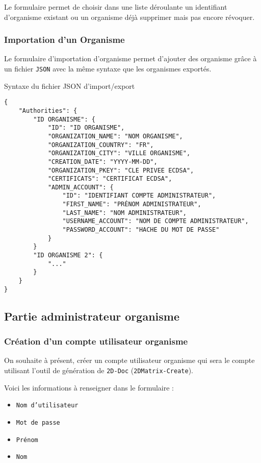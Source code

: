 Le formulaire permet de choisir dans une liste déroulante un identifiant d'organisme existant ou un organisme déjà supprimer mais pas encore révoquer.

\subsubsection{Importation d'un Organisme}\label{import}

Le formulaire d'importation d'organisme permet d'ajouter des organisme grâce à un fichier \texttt{JSON} avec la même syntaxe que les organismes exportés. 

\begin{center}
    Syntaxe du fichier JSON d'import/export
\end{center}

\begin{verbatim}
{
    "Authorities": {
        "ID ORGANISME": {
            "ID": "ID ORGANISME",
            "ORGANIZATION_NAME": "NOM ORGANISME",
            "ORGANIZATION_COUNTRY": "FR",
            "ORGANIZATION_CITY": "VILLE ORGANISME",
            "CREATION_DATE": "YYYY-MM-DD",
            "ORGANIZATION_PKEY": "CLE PRIVEE ECDSA",
            "CERTIFICATS": "CERTIFICAT ECDSA",
            "ADMIN_ACCOUNT": {
                "ID": "IDENTIFIANT COMPTE ADMINISTRATEUR",
                "FIRST_NAME": "PRÉNOM ADMINISTRATEUR",
                "LAST_NAME": "NOM ADMINISTRATEUR",
                "USERNAME_ACCOUNT": "NOM DE COMPTE ADMINISTRATEUR",
                "PASSWORD_ACCOUNT": "HACHE DU MOT DE PASSE"
            }
        }
        "ID ORGANISME 2": {
            "..."
        }
    }
}
\end{verbatim}

\subsection{Partie administrateur organisme}\label{manageadmorga}

\subsubsection{Création d'un compte utilisateur organisme}
On souhaite à présent, créer un compte utilisateur organisme qui sera le compte utilisant l'outil de génération de \texttt{2D-Doc} (\texttt{2DMatrix-Create}).

Voici les informations à renseigner dans le formulaire :
\begin{itemize}
    \item \texttt{Nom d'utilisateur}
    \item \texttt{Mot de passe}
    \item \texttt{Prénom}
    \item \texttt{Nom}
\end{itemize}

